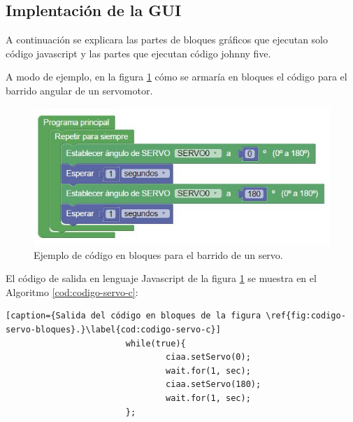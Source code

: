 \subsection{Implentación de la GUI}
\label{subsec:Implentación de la GUI}

A continuación se explicara las partes de bloques gráficos que ejecutan solo código javascript y las partes que ejecutan código johnny five.

A modo de ejemplo, en la figura \ref{fig:codigo-servo-bloques} cómo se armaría en bloques el código para el barrido angular de un servomotor.

\begin{figure}[!htbp]
	\centering
	\includegraphics[scale=.8]{./Figures/ejemplo-servo.jpg}
	\caption{Ejemplo de código en bloques para el barrido de un servo.}
	\label{fig:codigo-servo-bloques}
\end{figure}

El código de salida en lenguaje Javascript de la figura \ref{fig:codigo-servo-bloques} se muestra 
en el Algoritmo \ref{cod:codigo-servo-c}:


\begin{lstlisting}[caption={Salida del código en bloques de la figura \ref{fig:codigo-servo-bloques}.}\label{cod:codigo-servo-c}] 
		                while(true){
			                	ciaa.setServo(0);
			                	wait.for(1, sec);
				                ciaa.setServo(180);
				                wait.for(1, sec);
		                };

\end{lstlisting}


